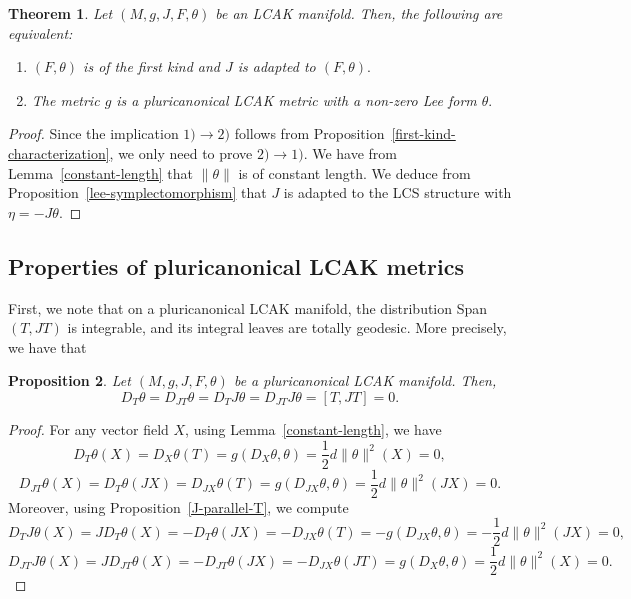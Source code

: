 \documentclass[a4paper,11pt]{amsart}
\newtheorem{thm}{Theorem}
\newtheorem{prop}[thm]{Proposition}
\theoremstyle{definition}
\renewcommand{\[}{\begin{equation*}}
\renewcommand{\]}{\end{equation*}}
\begin{document}
\begin{thm}\label{equivalence-first_kind-pluri}
  Let $(M, g, J, F, \theta)$ be an LCAK manifold. Then, the following are equivalent:
\begin{enumerate}[label=\arabic*)]
\item $(F,\theta)$ is of the first kind and $J$ is adapted to $(F,\theta).$\\
\item The metric $g$ is a pluricanonical LCAK metric with a non-zero Lee form $\theta.$
\end{enumerate}
\end{thm}
\begin{proof}
Since the implication $1)\rightarrow 2)$ follows from Proposition~\ref{first-kind-characterization}, we only need to prove $2)\rightarrow 1)$. 
We have from Lemma~\ref{constant-length} that $\|\theta\|$ is of constant length. We deduce from Proposition~\ref{lee-symplectomorphism} that $J$ is adapted to the LCS structure with $\eta=-J\theta.$
\end{proof}

\subsection{Properties of pluricanonical LCAK metrics}

First, we note that on a pluricanonical LCAK manifold, the distribution Span$(T,JT)$ is integrable, and its integral leaves are totally geodesic. More precisely, we have that

\begin{prop}
Let $(M, g, J, F, \theta)$ be a pluricanonical LCAK manifold. Then, $$D_T\theta=D_{JT}\theta=D_{T}J\theta=D_{JT}J\theta=[T,JT]=0.$$
\end{prop}
\begin{proof}
For any vector field $X$, using Lemma~\ref{constant-length}, we have
$$D_{T}\theta(X)=D_X\theta(T)=g(D_X\theta,\theta)=\frac{1}{2}d\|\theta\|^2(X)=0,$$
$$D_{JT}\theta(X)=D_{T}\theta(JX)=D_{JX}\theta(T)=g(D_{JX}\theta,\theta)=\frac{1}{2}d\|\theta\|^2(JX)=0.$$
Moreover, using Proposition~\ref{J-parallel-T}, we compute
$$D_{T}J\theta(X)=JD_{T}\theta(X)=-D_{T}\theta(JX)=-D_{JX}\theta(T)=-g(D_{JX}\theta,\theta)=-\frac{1}{2}d\|\theta\|^2(JX)=0,$$
$$D_{JT}J\theta(X)=JD_{JT}\theta(X)=-D_{JT}\theta(JX)=-D_{JX}\theta(JT)=g(D_{X}\theta,\theta)=\frac{1}{2}d\|\theta\|^2(X)=0.$$

\end{proof}
\end{document}
